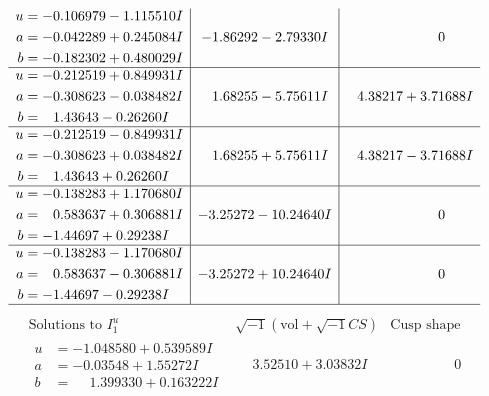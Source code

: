 \documentclass[1p]{elsarticle_modified}
\theoremstyle{definition}
\newcommand{\I}{\sqrt{-1}}
\begin{document}
$$\begin{array}{c|c|c}
\begin{aligned}
u &= -0.106979 - 1.115510 I \\
a &= -0.042289 + 0.245084 I \\
b &= -0.182302 + 0.480029 I\end{aligned}
 & -1.86292 - 2.79330 I & \phantom{-0.000000 } 0 \\ \hline\begin{aligned}
u &= -0.212519 + 0.849931 I \\
a &= -0.308623 - 0.038482 I \\
b &= \phantom{-}1.43643 - 0.26260 I\end{aligned}
 & \phantom{-}1.68255 - 5.75611 I & \phantom{-}4.38217 + 3.71688 I \\ \hline\begin{aligned}
u &= -0.212519 - 0.849931 I \\
a &= -0.308623 + 0.038482 I \\
b &= \phantom{-}1.43643 + 0.26260 I\end{aligned}
 & \phantom{-}1.68255 + 5.75611 I & \phantom{-}4.38217 - 3.71688 I \\ \hline\begin{aligned}
u &= -0.138283 + 1.170680 I \\
a &= \phantom{-}0.583637 + 0.306881 I \\
b &= -1.44697 + 0.29238 I\end{aligned}
 & -3.25272 - 10.24640 I & \phantom{-0.000000 } 0 \\ \hline\begin{aligned}
u &= -0.138283 - 1.170680 I \\
a &= \phantom{-}0.583637 - 0.306881 I \\
b &= -1.44697 - 0.29238 I\end{aligned}
 & -3.25272 + 10.24640 I & \phantom{-0.000000 } 0\\
 \hline 
 \end{array}$$\newpage$$\begin{array}{c|c|c}  
\text{Solutions to }I^u_{1}& \I (\text{vol} + \sqrt{-1}CS) & \text{Cusp shape}\\
 \hline 
\begin{aligned}
u &= -1.048580 + 0.539589 I \\
a &= -0.03548 + 1.55272 I \\
b &= \phantom{-}1.399330 + 0.163222 I\end{aligned}
 & \phantom{-}3.52510 + 3.03832 I & \phantom{-0.000000 } 0 \\ \hline\begin{aligned}

\end{aligned}
\end{array}$$
\end{document}

